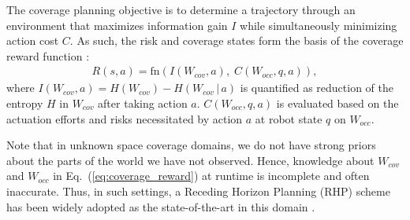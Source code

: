 \documentclass[letterpaper]{article} %
\newcommand{\ph}[1]{{\textbf{#1}:}} %
\newcommand{\phdone}[1]{} %
\begin{document}
The coverage planning objective is to determine a trajectory through an environment that maximizes information gain $I$ while simultaneously minimizing action cost $C$. As such, the risk and coverage states form the basis of the coverage reward function :
\begin{align}
  R(s, a) = \mathrm{fn}(I(W_{cov}, a),\; C(W_{occ}, q, a)),
  \label{eq:coverage_reward}
\end{align}
where $I(W_{cov}, a) = H(W_{cov}) - H(W_{cov} \,|\, a)$ is quantified as reduction of the entropy $H$ in $W_{cov}$ after taking action $a$. $C(W_{occ}, q, a)$ is evaluated based on the actuation efforts and risks necessitated by action $a$ at robot state $q$ on $W_{occ}$.

\phdone{Receding Horizon Planning}
Note that in unknown space coverage domains, we do not have strong priors about the parts of the world we have not observed. Hence, knowledge about $W_{cov}$ and $W_{occ}$ in Eq.~(\ref{eq:coverage_reward}) at runtime is incomplete and often inaccurate.
%
Thus, in such settings, a Receding Horizon Planning (RHP) scheme has been widely adopted as the state-of-the-art in this domain \cite{bircher2016receding}.
\end{document}
